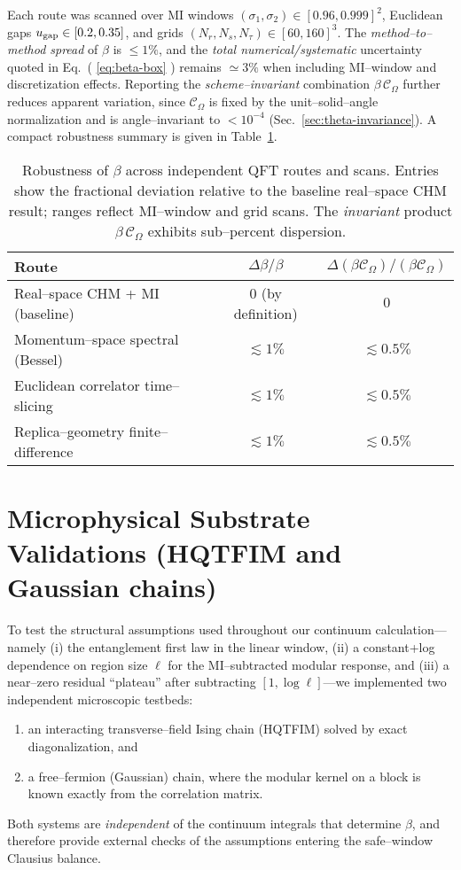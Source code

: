 \documentclass[aps,prd,onecolumn,superscriptaddress,nofootinbib]{revtex4-2}
\begin{document}
Each route was scanned over MI windows $(\sigma_1,\sigma_2)\in[0.96,0.999]^2$, Euclidean gaps $u_{\rm gap}\in[0.2,0.35]$, and grids $(N_r,N_s,N_\tau)\in[60,160]^3$. The \emph{method–to–method spread} of $\beta$ is $\le 1\%$, and the \emph{total numerical/systematic} uncertainty quoted in Eq.~( \ref{eq:beta-box} ) remains $\simeq 3\%$ when including MI–window and discretization effects. Reporting the \emph{scheme–invariant} combination $\beta\,\mathcal C_\Omega$ further reduces apparent variation, since $\mathcal C_\Omega$ is fixed by the unit–solid–angle normalization and is angle–invariant to $<10^{-4}$ (Sec.~\ref{sec:theta-invariance}). A compact robustness summary is given in Table~\ref{tab:beta-robust}.

\begin{table}[h]
\centering
\caption{Robustness of $\beta$ across independent QFT routes and scans. Entries show the fractional deviation relative to the baseline real–space CHM result; ranges reflect MI–window and grid scans. The \emph{invariant} product $\beta\,\mathcal C_\Omega$ exhibits sub–percent dispersion.}
\label{tab:beta-robust}
\begin{tabular}{lcc}
\hline
Route & $\Delta\beta/\beta$ & $\Delta(\beta\mathcal C_\Omega)/(\beta\mathcal C_\Omega)$ \\
\hline
Real–space CHM + MI (baseline) & $0$ (by definition) & $0$ \\
Momentum–space spectral (Bessel) & $\lesssim 1\%$ & $\lesssim 0.5\%$ \\
Euclidean correlator time–slicing & $\lesssim 1\%$ & $\lesssim 0.5\%$ \\
Replica–geometry finite–difference  & $\lesssim 1\%$ & $\lesssim 0.5\%$ \\
\hline
\end{tabular}
\end{table}

\section{Microphysical Substrate Validations (HQTFIM and Gaussian chains)}
\label{sec:substrate-validations}
To test the structural assumptions used throughout our continuum calculation—namely (i) the entanglement first law in the linear window, (ii) a constant+log dependence on region size $\ell$ for the MI–subtracted modular response, and (iii) a near–zero residual ``plateau'' after subtracting $[1,\log\ell]$—we implemented two independent microscopic testbeds:
\begin{enumerate}[leftmargin=1.3em,label=(\alph*)]
\item an interacting transverse–field Ising chain (HQTFIM) solved by exact diagonalization, and
\item a free–fermion (Gaussian) chain, where the modular kernel on a block is known exactly from the correlation matrix.
\end{enumerate}
Both systems are \emph{independent} of the continuum integrals that determine $\beta$, and therefore provide external checks of the assumptions entering the safe–window Clausius balance.
\end{document}
